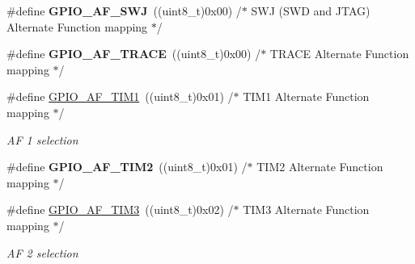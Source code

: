 \begin{DoxyCompactItemize}
\#define {\bfseries G\+P\+I\+O\+\_\+\+A\+F\+\_\+\+S\+WJ}~((uint8\+\_\+t)0x00)  /$\ast$ S\+W\+J (\+S\+W\+D and J\+T\+A\+G) Alternate Function mapping $\ast$/
\item 
\mbox{\label{group___g_p_i_o___alternat__function__selection__define_gac97ace879d6584f8bd705fa1d199d4d4}} 
\#define {\bfseries G\+P\+I\+O\+\_\+\+A\+F\+\_\+\+T\+R\+A\+CE}~((uint8\+\_\+t)0x00)  /$\ast$ T\+R\+A\+C\+E Alternate Function mapping $\ast$/
\item 
\mbox{\label{group___g_p_i_o___alternat__function__selection__define_ga9a65573a3d8684febe1fda5c6cd8c992}} 
\#define \mbox{\hyperlink{group___g_p_i_o___alternat__function__selection__define_ga9a65573a3d8684febe1fda5c6cd8c992}{G\+P\+I\+O\+\_\+\+A\+F\+\_\+\+T\+I\+M1}}~((uint8\+\_\+t)0x01)  /$\ast$ T\+I\+M1 Alternate Function mapping $\ast$/
\begin{DoxyCompactList}\small\item\em AF 1 selection ~\newline
 \end{DoxyCompactList}\item 
\mbox{\label{group___g_p_i_o___alternat__function__selection__define_ga6a1335e47fe67ff5a08ebe0ebfec2ffa}} 
\#define {\bfseries G\+P\+I\+O\+\_\+\+A\+F\+\_\+\+T\+I\+M2}~((uint8\+\_\+t)0x01)  /$\ast$ T\+I\+M2 Alternate Function mapping $\ast$/
\item 
\mbox{\label{group___g_p_i_o___alternat__function__selection__define_ga8c6bda0c56abc29eef7709b52d9d3e0d}} 
\#define \mbox{\hyperlink{group___g_p_i_o___alternat__function__selection__define_ga8c6bda0c56abc29eef7709b52d9d3e0d}{G\+P\+I\+O\+\_\+\+A\+F\+\_\+\+T\+I\+M3}}~((uint8\+\_\+t)0x02)  /$\ast$ T\+I\+M3 Alternate Function mapping $\ast$/
\begin{DoxyCompactList}\small\item\em AF 2 selection ~\newline
 \end{DoxyCompactList}\item 
\mbox{\label{group___g_p_i_o___alternat__function__selection__define_gabe02d26327e89fe4c9aaf30ec1187009}} 

\end{DoxyCompactItemize}
